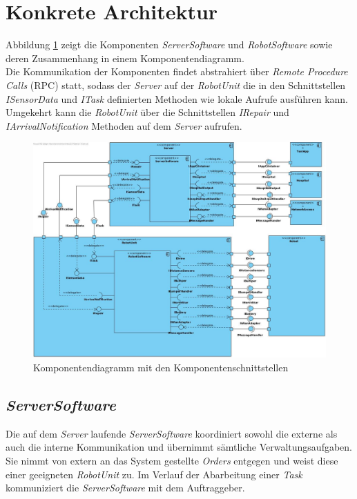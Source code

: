 \section{Konkrete Architektur}

Abbildung \ref{KomponentendiagrammKonkret} zeigt die Komponenten \emph{ServerSoftware} und \emph{RobotSoftware} sowie deren Zusammenhang in einem Komponentendiagramm. \\ Die Kommunikation der Komponenten findet abstrahiert über \emph{Remote Procedure Calls} (RPC) statt, sodass der \emph{Server} auf der \emph{RobotUnit} die in den Schnittstellen \emph{ISensorData} und \emph{ITask} definierten Methoden wie lokale Aufrufe ausführen kann. Umgekehrt kann die \emph{RobotUnit} über die Schnittstellen \emph{IRepair} und \emph{IArrivalNotification} Methoden auf dem \emph{Server} aufrufen.

\begin{figure}[H]
\centering
\includegraphics[width=1\textwidth]{img/2-Entwurf-4-KonkreteArchitektur}
\caption{Komponentendiagramm mit den Komponentenschnittstellen}
\label{KomponentendiagrammKonkret}
\end{figure}

\subsection{\textit{ServerSoftware}}

Die auf dem \emph{Server} laufende \emph{ServerSoftware} koordiniert sowohl die externe als auch die interne Kommunikation und übernimmt sämtliche Verwaltungsaufgaben. Sie nimmt von extern an das System gestellte \emph{Orders} entgegen und weist diese einer geeigneten \emph{RobotUnit} zu. Im Verlauf der Abarbeitung einer \emph{Task} kommuniziert die \emph{ServerSoftware} mit dem Auftraggeber.

